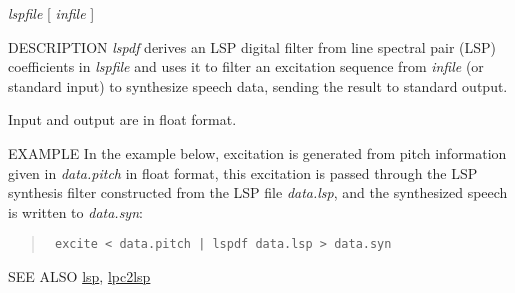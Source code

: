\begin{synopsis}
\item [lspdf] [ --m $M$ ] [ --p $P$ ] [ --i $I$ ] [ --s $S$ ] [ --o $O$ ] 
              [ --k ] [ --l ] {\em lspfile} [ {\em infile} ] 
\end{synopsis}

\begin{qsection}{DESCRIPTION}
{\em lspdf} derives an LSP digital filter 
from line spectral pair (LSP) coefficients in {\em lspfile} 
and uses it to filter an excitation sequence
from {\em infile} (or standard input) to synthesize speech data, 
sending the result to standard output.

Input and output are in float format.
\end{qsection}

\begin{options}
\end{options}

\begin{qsection}{EXAMPLE}
In the example below, excitation is generated from
pitch information given in {\em data.pitch} in float format,
this excitation is passed through the LSP synthesis filter
constructed from the LSP file {\em data.lsp},
and the synthesized speech is written to {\em data.syn}:
\begin{quote}
\verb! excite < data.pitch | lspdf data.lsp > data.syn!
\end{quote}
\end{qsection}

\begin{qsection}{SEE ALSO}
\hyperlink{lsp}{lsp},
\hyperlink{lpc2lsp}{lpc2lsp}
\end{qsection}
